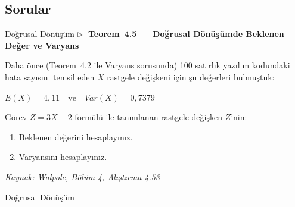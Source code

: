 \documentclass[light]{lutbeamer}
\begin{document}
\subsection{Sorular}

\begin{frame}{Doğrusal Dönüşüm}
  \textbf{\small $\triangleright$~Teorem~4.5 --- Doğrusal Dönüşümde Beklenen Değer ve Varyans}

  \smallskip
  \small
  Daha önce (Teorem~4.2 ile Varyans sorusunda) 100 satırlık yazılım kodundaki hata sayısını temsil eden $X$ rastgele değişkeni için şu değerleri bulmuştuk:
  \begin{center}
    $E(X) = 4{,}11 \quad \text{ve} \quad Var(X) = 0{,}7379$
  \end{center}

  \begin{block}{Görev}
    $Z = 3X - 2$ formülü ile tanımlanan rastgele değişken $Z$'nin:
    \begin{enumerate}
      \item[(a)] Beklenen değerini hesaplayınız.
      \item[(b)] Varyansını hesaplayınız.
    \end{enumerate}
  \end{block}
  \vspace{0.2cm}
  {\footnotesize \textit{Kaynak: Walpole, Bölüm 4, Alıştırma 4.53 \cite{walpole_ch4}}}
\end{frame}

\begin{frame}{Doğrusal Dönüşüm}
\end{frame}
\end{document}
